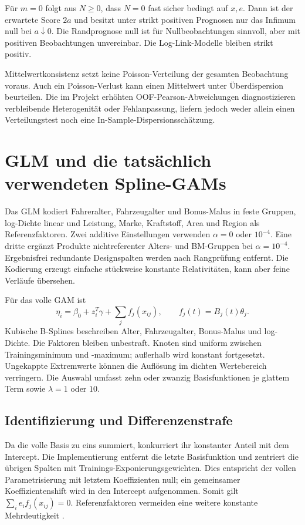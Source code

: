 \documentclass[11pt,a4paper]{article}
\begin{document}
Für $m=0$ folgt aus $N\geq0$, dass $N=0$ fast sicher bedingt auf $x,e$. Dann ist der erwartete Score $2a$ und besitzt unter strikt positiven Prognosen nur das Infimum null bei $a\downarrow0$. Die Randprognose null ist für Nullbeobachtungen sinnvoll, aber mit positiven Beobachtungen unvereinbar. Die Log-Link-Modelle bleiben strikt positiv.

Mittelwertkonsistenz setzt keine Poisson-Verteilung der gesamten Beobachtung voraus. Auch ein Poisson-Verlust kann einen Mittelwert unter Überdispersion beurteilen. Die im Projekt erhöhten OOF-Pearson-Abweichungen diagnostizieren verbleibende Heterogenität oder Fehlanpassung, liefern jedoch weder allein einen Verteilungstest noch eine In-Sample-Dispersionsschätzung.

\clearpage
\section{GLM und die tatsächlich verwendeten Spline-GAMs}
Das GLM kodiert Fahreralter, Fahrzeugalter und Bonus-Malus in feste Gruppen, log-Dichte linear und Leistung, Marke, Kraftstoff, Area und Region als Referenzfaktoren. Zwei additive Einstellungen verwenden $\alpha=0$ oder $10^{-4}$. Eine dritte ergänzt Produkte nichtreferenter Alters- und BM-Gruppen bei $\alpha=10^{-4}$. Ergebnisfrei redundante Designspalten werden nach Rangprüfung entfernt. Die Kodierung erzeugt einfache stückweise konstante Relativitäten, kann aber feine Verläufe übersehen.

Für das volle GAM ist
\begin{equation}
 \eta_i=\beta_0+z_i^T\gamma+\sum_j f_j(x_{ij}),\qquad
 f_j(t)=B_j(t)\theta_j.
\end{equation}
Kubische B-Splines beschreiben Alter, Fahrzeugalter, Bonus-Malus und log-Dichte. Die Faktoren bleiben unbestraft. Knoten sind uniform zwischen Trainingsminimum und -maximum; außerhalb wird konstant fortgesetzt. Ungekappte Extremwerte können die Auflösung im dichten Wertebereich verringern. Die Auswahl umfasst zehn oder zwanzig Basisfunktionen je glattem Term sowie $\lambda=1$ oder $10$.

\subsection*{Identifizierung und Differenzenstrafe}
Da die volle Basis zu eins summiert, konkurriert ihr konstanter Anteil mit dem Intercept. Die Implementierung entfernt die letzte Basisfunktion und zentriert die übrigen Spalten mit Trainings-Exponierungsgewichten. Dies entspricht der vollen Parametrisierung mit letztem Koeffizienten null; ein gemeinsamer Koeffizientenshift wird in den Intercept aufgenommen. Somit gilt $\sum_i e_if_j(x_{ij})=0$. Referenzfaktoren vermeiden eine weitere konstante Mehrdeutigkeit \cite{wood}.
\end{document}
